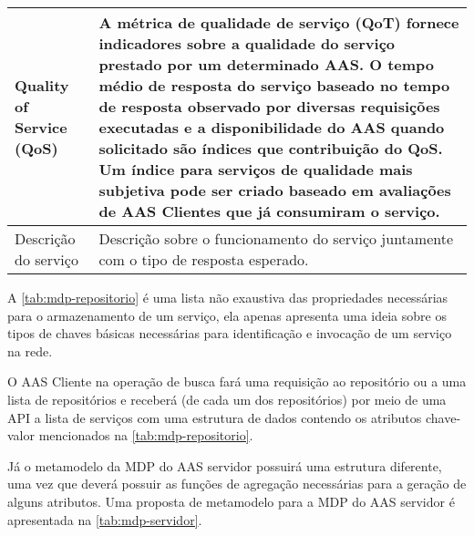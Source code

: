 \begin{table}[htb]
\begin{tabular}{p{3cm}p{12cm}}
			\hline
			Quality of Service (QoS)
			
			& A métrica de qualidade de serviço (QoT) fornece indicadores sobre a qualidade do serviço prestado por um determinado AAS. O tempo médio de resposta do serviço baseado no tempo de resposta observado por diversas requisições executadas e a disponibilidade do AAS quando solicitado são índices que contribuição do QoS. Um índice para serviços de qualidade mais subjetiva pode ser criado baseado em avaliações de AAS Clientes que já consumiram o serviço.\\
			
			\hline
			Descrição do serviço
			& Descrição sobre o funcionamento do serviço juntamente com o tipo de resposta esperado.  \\			
			\hline
		\end{tabular}
	\end{table}
	
	A \autoref{tab:mdp-repositorio} é uma lista não exaustiva das propriedades necessárias para o armazenamento de um serviço, ela apenas apresenta uma ideia sobre os tipos de chaves básicas necessárias para identificação e invocação de um serviço na rede.
	
	O AAS Cliente na operação de busca fará uma requisição ao repositório ou a uma lista de repositórios e receberá (de cada um dos repositórios) por meio de uma API a lista de serviços com uma estrutura de dados contendo os atributos chave-valor mencionados na \autoref{tab:mdp-repositorio}.
	
	Já o metamodelo da MDP do AAS servidor possuirá uma estrutura diferente, uma vez que deverá possuir as funções de agregação necessárias para a geração de alguns atributos. Uma proposta de metamodelo para a MDP do AAS servidor é apresentada na \autoref{tab:mdp-servidor}.
	
